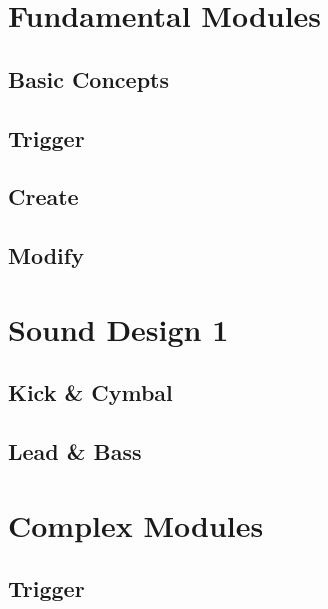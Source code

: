 \documentclass[
]{book}
\begin{document}
\hypertarget{part-fundamental-modules}{%
\part{Fundamental Modules}\label{part-fundamental-modules}}

\hypertarget{basic-concepts}{%
\chapter{Basic Concepts}\label{basic-concepts}}

\hypertarget{trigger}{%
\chapter{Trigger}\label{trigger}}

\hypertarget{create}{%
\chapter{Create}\label{create}}

\hypertarget{modify}{%
\chapter{Modify}\label{modify}}

\hypertarget{part-sound-design-1}{%
\part{Sound Design 1}\label{part-sound-design-1}}

\hypertarget{kick-cymbal}{%
\chapter{Kick \& Cymbal}\label{kick-cymbal}}

\hypertarget{lead-bass}{%
\chapter{Lead \& Bass}\label{lead-bass}}

\hypertarget{part-complex-modules}{%
\part{Complex Modules}\label{part-complex-modules}}

\hypertarget{trigger-1}{%
\chapter{Trigger}\label{trigger-1}}
\end{document}
